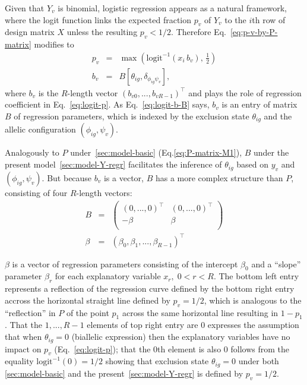 \documentclass[letterpaper]{article}
\begin{document}
Given that \(Y_v\) is binomial, logistic regression appears as a natural
framework, where the logit function links the expected fraction \(p_v\) of
\(Y_v\) to the \(i\)th row of design matrix \(X\) unless the resulting
\(p_v<1/2\).  Therefore Eq.~\ref{eq:p-v-by-P-matrix} modifies to
\begin{eqnarray}
\label{eq:logit-p}
p_v &=& \max \left( \mathrm{logit}^{-1}(x_i\, b_v), \, \frac{1}{2} \right) \\
\label{eq:logit-b-B}
b_v &=& B[\theta_{ig},\delta_{\phi_{ig}\psi_v}],
\end{eqnarray}
where \(b_v\) is the
\(R\)-length vector \((b_{v0},...,b_{vR-1})^\top\) and plays the role of
regression coefficient in Eq.~\ref{eq:logit-p}. As Eq.~\ref{eq:logit-b-B}
says, \(b_v\) is an entry of matrix \(B\) of regression parameters,
which is indexed by the exclusion state \(\theta_{ig}\) and the allelic configuration
\((\phi_{ig},\psi_v)\).

Analogously to \(P\) under~\ref{sec:model-basic} (Eq.\ref{eq:P-matrix-M1}),
\(B\) under the present model~\ref{sec:model-Y-regr} facilitates the inference
of \(\theta_{ig}\) based on \(y_v\) and \((\phi_{ig},\psi_v)\).  But because
\(b_v\) is a vector, \(B\) has a more complex structure than \(P\), consisting
of four \(R\)-length vectors:
\begin{eqnarray}
\label{eq:B-matrix-M2}
B &=&
\begin{pmatrix}
(0,...,0)^\top & (0,...,0)^\top \\
-\beta
&
\beta
\\
\end{pmatrix}
\\
\beta &=& (\beta_0,\beta_1,...,\beta_{R-1})^\top
\end{eqnarray}

\(\beta\) is a vector of regression parameters
consisting of the intercept \(\beta_0\) and a ``slope'' parameter
\(\beta_{r}\) for each explanatory variable \(x_r, \; 0<r<R\).
The bottom left entry represents a reflection of the regression curve defined
by the bottom right entry accross the horizontal straight line defined by \(p_v=1/2\),
which is analogous to the ``reflection'' in \(P\) of the point \(p_1\) across the same
horizontal line resulting in \(1-p_1\).
That the \(1,...,R-1\) elements of top right entry are \(0\) expresses the
assumption that when \(\theta_{ig}=0\) (biallelic expression) then the
explanatory variables have no impact on \(p_v\) (Eq.~\ref{eq:logit-p}); that
the \(0\)th element is also \(0\) follows from the equality
\(\mathrm{logit}^{-1}(0)=1/2\) showing that exclusion state \(\theta_{ig}=0\)
under both \ref{sec:model-basic} and the present~\ref{sec:model-Y-regr}
is defined by \(p_v=1/2\).
\end{document}
